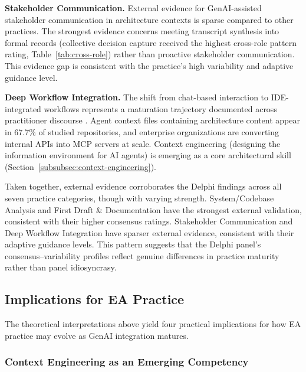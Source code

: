 \textbf{Stakeholder Communication.} External evidence for GenAI-assisted
stakeholder communication in architecture contexts is sparse compared to other
practices. The strongest evidence concerns meeting transcript synthesis into
formal records (collective decision capture received the highest cross-role
pattern rating, Table~\ref{tab:cross-role}) rather than proactive
stakeholder communication. This evidence gap is consistent with the practice's
high variability and adaptive guidance level.

\textbf{Deep Workflow Integration.} The shift from chat-based interaction to
IDE-integrated workflows represents a maturation trajectory documented across
practitioner discourse \parencite{rajasekaran_context_engineering_2025,
chatlatanagulchai_agent_readmes_2025}. Agent context files containing
architecture content appear in 67.7\% of studied repositories, and enterprise
organizations are converting internal APIs into MCP servers at scale. Context
engineering (designing the information environment for AI agents) is emerging as
a core architectural skill (Section~\ref{subsubsec:context-engineering}).

Taken together, external evidence corroborates the Delphi findings across all
seven practice categories, though with varying strength. System/Codebase
Analysis and First Draft \& Documentation have the strongest external
validation, consistent with their higher consensus ratings. Stakeholder
Communication and Deep Workflow Integration have sparser external evidence,
consistent with their adaptive guidance levels. This pattern suggests that
the Delphi panel's consensus--variability profiles reflect genuine differences
in practice maturity rather than panel idiosyncrasy.

\subsection{Implications for EA Practice}\label{subsec:disc-implications-practice}

The theoretical interpretations above yield four practical implications for
how EA practice may evolve as GenAI integration matures.

\subsubsection{Context Engineering as an Emerging Competency}\label{subsubsec:disc-context-eng}


